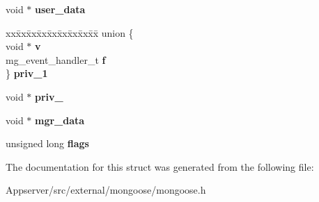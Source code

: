\begin{DoxyCompactItemize}
\item 
void $\ast$ {\bfseries user\+\_\+data}\hypertarget{structmg__connection_ab6d66a4eacc5d4d15f817ce98f26322d}{}\label{structmg__connection_ab6d66a4eacc5d4d15f817ce98f26322d}

\item 
\begin{tabbing}
xx\=xx\=xx\=xx\=xx\=xx\=xx\=xx\=xx\=\kill
union \{\\
\>void $\ast$ {\bfseries v}\\
\>mg\_event\_handler\_t {\bfseries f}\\
\} {\bfseries priv\_1}\hypertarget{structmg__connection_a67f1257d9d36f09eaaaebbd3ec2ff0fb}{}\label{structmg__connection_a67f1257d9d36f09eaaaebbd3ec2ff0fb}
\\

\end{tabbing}\item 
void $\ast$ {\bfseries priv\+\_}\hypertarget{structmg__connection_aeb5efea496ac74ed2e0b8864f4fd6f65}{}\label{structmg__connection_aeb5efea496ac74ed2e0b8864f4fd6f65}

\item 
void $\ast$ {\bfseries mgr\+\_\+data}\hypertarget{structmg__connection_a19cb5ee4c2402582dcf4cb6a4f899136}{}\label{structmg__connection_a19cb5ee4c2402582dcf4cb6a4f899136}

\item 
unsigned long {\bfseries flags}\hypertarget{structmg__connection_aa47edda11152dd7769a76d806a87e1aa}{}\label{structmg__connection_aa47edda11152dd7769a76d806a87e1aa}

\end{DoxyCompactItemize}


The documentation for this struct was generated from the following file\+:\begin{DoxyCompactItemize}
\item 
Appserver/src/external/mongoose/mongoose.\+h\end{DoxyCompactItemize}
